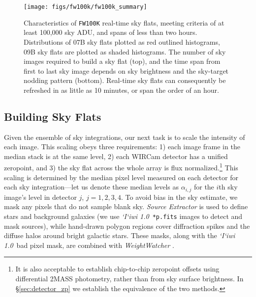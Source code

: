 \documentclass[iop]{emulateapj}
\newcommand{\sw}[1]{\textit{#1}} %
\newcommand{\iiwione}{\sw{`I`iwi 1.0}}
\newcommand{\Sec}[1]{\S\ref{sec:#1}}  %
\begin{document}
\begin{figure}[t]
\centering
\texttt{[image: figs/fw100k/fw100k\_summary]}
\caption{Characteristics of \texttt{FW100K} real-time sky flats, meeting criteria of at least 100,000 sky ADU, and spans of less than two hours.
Distributions of 07B sky flats plotted as red outlined histograms, 09B sky flats are plotted as shaded histograms.
The number of sky images required to build a sky flat (top), and the time span from first to last sky image depends on sky brightness and the sky-target nodding pattern (bottom).
Real-time sky flats can consequently be refreshed in as little as 10 minutes, or span the order of an hour.}
\label{fig:fw100k_summary}
\end{figure}

\subsection{Building Sky Flats}
\label{sec:flatbuilding}

Given the ensemble of sky integrations, our next task is to scale the intensity of each image.
This scaling obeys three requirements: 1) each image frame in the median stack is at the same level, 2) each WIRCam detector has a unified zeropoint, and 3) the sky flat across the whole array is flux normalized.\footnote{It is also acceptable to establish chip-to-chip zeropoint offsets using differential 2MASS photometry, rather than from sky surface brightness. In \Sec{detector_zp} we establish the equivalence of the two methods.}
This scaling is determined by the median pixel level measured on each detector for each sky integration---let us denote these median levels as $\alpha_{i,j}$ for the $i$th sky image's level in detector $j$, $j=1, 2, 3, 4$.
To avoid bias in the sky estimate, we mask any pixels that do not sample blank sky.
\sw{Source Extractor} \citep{Bertin:1996} is used to define stars and background galaxies (we use \iiwione\ \texttt{*p.fits} images to detect and mask sources), while hand-drawn polygon regions cover diffraction spikes and the diffuse halos around bright galactic stars. These masks, along with the \iiwione\ bad pixel mask, are combined with \sw{WeightWatcher} \citep{Marmo:2008}.
\end{document}
